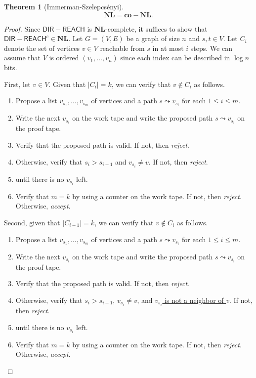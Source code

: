 \documentclass[10pt,letterpaper,cm]{nupset}
\theoremstyle{definition}
\theoremstyle{theorem}
\newtheorem{theorem}[definition]{Theorem}
\theoremstyle{remark}
\newcommand{\1}{\mathbf{1}}
\newcommand{\0}{\vec 0}
\begin{document}
\begin{theorem}[Immerman-Szelepcs\'enyi]
$$\mathbf{NL} = \mathbf{co}{-}{\mathbf{NL}}.$$
\end{theorem}
\begin{proof}
Since $\mathsf{DIR{-}REACH}$ is $\mathbf{NL}$-complete, it suffices to show that $\mathsf{DIR{-}REACH}^c\in \mathbf{NL}.$  
Let $G= \left(V, E\right)$ be a graph of size $n$ and $s, t\in V$. Let $C_i$ denote the set of vertices $v\in V$ reachable from $s$ in at most $i$ steps. We can assume that $V$ is ordered $\left(v_1, \ldots, v_n\right)$ since each index can be described in $\log{n}$ bits.

\medskip

First, let $v\in V$. Given that $\left\lvert{C_i}\right\rvert = k$, we can verify that $v \notin C_i$ as follows. 
\begin{enumerate}
\item Propose a list $v_{s_1}, \ldots, v_{s_m}$ of vertices and a path $s\leadsto v_{s_i}$ for each $1\leq i \leq m$. 
\item Write the next $v_{s_i}$ on the work tape and write the proposed path $s \leadsto v_{s_i}$ on the proof tape. 
\item Verify that the proposed path is valid. If not, then \textit{reject}.
\item Otherwise, verify that $s_i > s_{i-1}$ and $v_{s_i} \ne v$. If not, then \textit{reject}. 
\item {} until there is no $v_{s_i}$ left. 
\item Verify that $m = k$ by using a counter on the work tape. If not, then \textit{reject}. Otherwise, \textit{accept}.
\end{enumerate}

\smallskip

Second, given that $\left\lvert{C_{i-1}}\right\rvert = k$,  we can verify that $v\notin C_i$ as follows.
\begin{enumerate}
\item Propose a list $v_{s_1}, \ldots, v_{s_m}$ of vertices and a path $s\leadsto v_{s_i}$ for each $1\leq i \leq m$. 
\item Write the next $v_{s_i}$ on the work tape and write the proposed path $s \leadsto v_{s_i}$ on the proof tape. 
\item Verify that the proposed path is valid. If not, then \textit{reject}.
\item Otherwise, verify that $s_i > s_{i-1}$, $v_{s_i} \ne v$, and \underline{$v_{s_i}$ is not a neighbor of $v$}. If not, then \textit{reject}. 
\item {} until there is no $v_{s_i}$ left. 
\item Verify that $m = k$ by using a counter on the work tape. If not, then \textit{reject}. Otherwise, \textit{accept}.
\end{enumerate}


\end{proof}
\end{document}
